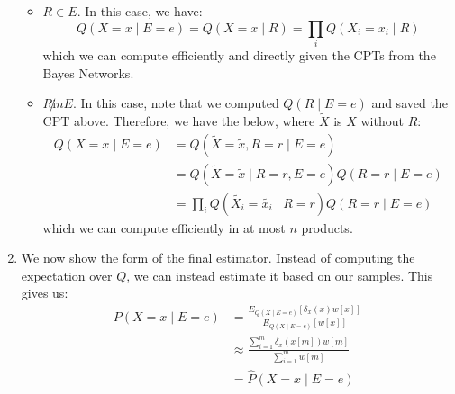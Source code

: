 \documentclass[12pt]{article}
\begin{document}
\begin{enumerate}[label=(\alph*)]
		\begin{itemize}
			\item $R \in E$. In this case, we have:
				$$
					Q(X = x \mid E = e) = Q(X = x \mid R) = \prod_{i} Q(X_i = x_i \mid R)
				$$
				which we can compute efficiently and directly given the CPTs from the Bayes Networks.
			\item $R \not in E$. In this case, note that we computed $Q(R \mid E=e)$ and saved the CPT above. Therefore, we have the below, where $\tilde{X}$ is $X$ without $R$:
			\begin{align*}
			Q(X = x \mid E = e) &= Q(\tilde{X} = \tilde{x}, R = r \mid E = e) \\
			&= Q(\tilde{X} = \tilde{x} \mid R = r, E =e )Q(R=r \mid E=e) \\
			&= \prod_{i} Q(\tilde{X_i} = \tilde{x_i} \mid R = r)Q(R = r \mid E = e)
			\end{align*}
			which we can compute efficiently in at most $n$ products.

		\end{itemize}

	\item We now show the form of the final estimator. Instead of computing the expectation over $Q$, we can instead estimate it based on our samples. This gives us:
	\begin{align*}
		P(X = x \mid E = e) &= \frac{E_{Q(X \mid E = e)}[\delta_x(x)w[x]]}{E_{Q(X \mid E = e)}[w[x]]} \tag{Results from (i)} \\
		&\approx \frac{\sum_{i=1}^m \delta_x(x[m]) w[m]}{\sum_{i=1}^m w[m]} \\
		&= \hat{P}(X = x \mid E = e)
	\end{align*}
\end{enumerate}
\end{document}
